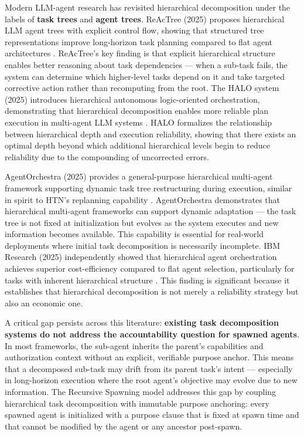 Modern LLM-agent research has revisited hierarchical decomposition under the labels of \textbf{task trees} and \textbf{agent trees}. ReAcTree (2025) proposes hierarchical LLM agent trees with explicit control flow, showing that structured tree representations improve long-horizon task planning compared to flat agent architectures \cite{reactree2025}. ReAcTree's key finding is that explicit hierarchical structure enables better reasoning about task dependencies — when a sub-task fails, the system can determine which higher-level tasks depend on it and take targeted corrective action rather than recomputing from the root. The HALO system (2025) introduces hierarchical autonomous logic-oriented orchestration, demonstrating that hierarchical decomposition enables more reliable plan execution in multi-agent LLM systems \cite{halo2025}. HALO formalizes the relationship between hierarchical depth and execution reliability, showing that there exists an optimal depth beyond which additional hierarchical levels begin to reduce reliability due to the compounding of uncorrected errors.

AgentOrchestra (2025) provides a general-purpose hierarchical multi-agent framework supporting dynamic task tree restructuring during execution, similar in spirit to HTN's replanning capability \cite{agentorchestra2025}. AgentOrchestra demonstrates that hierarchical multi-agent frameworks can support dynamic adaptation — the task tree is not fixed at initialization but evolves as the system executes and new information becomes available. This capability is essential for real-world deployments where initial task decomposition is necessarily incomplete. IBM Research (2025) independently showed that hierarchical agent orchestration achieves superior cost-efficiency compared to flat agent selection, particularly for tasks with inherent hierarchical structure \cite{ibm2025hierarchical}. This finding is significant because it establishes that hierarchical decomposition is not merely a reliability strategy but also an economic one.

A critical gap persists across this literature: \textbf{existing task decomposition systems do not address the accountability question for spawned agents}. In most frameworks, the sub-agent inherits the parent's capabilities and authorization context without an explicit, verifiable purpose anchor. This means that a decomposed sub-task may drift from its parent task's intent — especially in long-horizon execution where the root agent's objective may evolve due to new information. The Recursive Spawning model addresses this gap by coupling hierarchical task decomposition with immutable purpose anchoring: every spawned agent is initialized with a purpose clause that is fixed at spawn time and that cannot be modified by the agent or any ancestor post-spawn.

